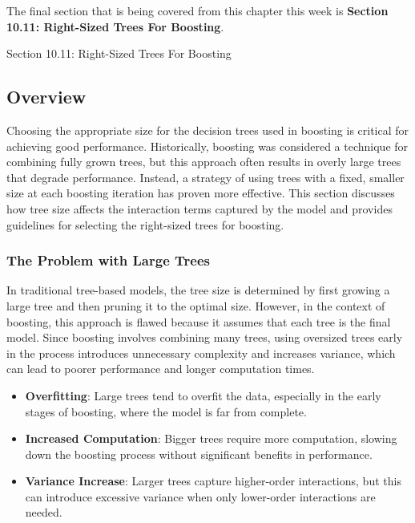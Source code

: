 The final section that is being covered from this chapter this week is \textbf{Section 10.11: Right-Sized Trees For Boosting}.

\begin{notes}{Section 10.11: Right-Sized Trees For Boosting}
    \subsection*{Overview}

    Choosing the appropriate size for the decision trees used in boosting is critical for achieving good performance. Historically, boosting was considered a technique for combining fully grown trees, 
    but this approach often results in overly large trees that degrade performance. Instead, a strategy of using trees with a fixed, smaller size at each boosting iteration has proven more effective. 
    This section discusses how tree size affects the interaction terms captured by the model and provides guidelines for selecting the right-sized trees for boosting.
    
    \subsubsection*{The Problem with Large Trees}
    
    In traditional tree-based models, the tree size is determined by first growing a large tree and then pruning it to the optimal size. However, in the context of boosting, this approach is flawed 
    because it assumes that each tree is the final model. Since boosting involves combining many trees, using oversized trees early in the process introduces unnecessary complexity and increases 
    variance, which can lead to poorer performance and longer computation times.
    
    \begin{highlight}
        \begin{itemize}
            \item \textbf{Overfitting}: Large trees tend to overfit the data, especially in the early stages of boosting, where the model is far from complete.
            \item \textbf{Increased Computation}: Bigger trees require more computation, slowing down the boosting process without significant benefits in performance.
            \item \textbf{Variance Increase}: Larger trees capture higher-order interactions, but this can introduce excessive variance when only lower-order interactions are needed.
        \end{itemize}
    \end{highlight}
    

\end{notes}
